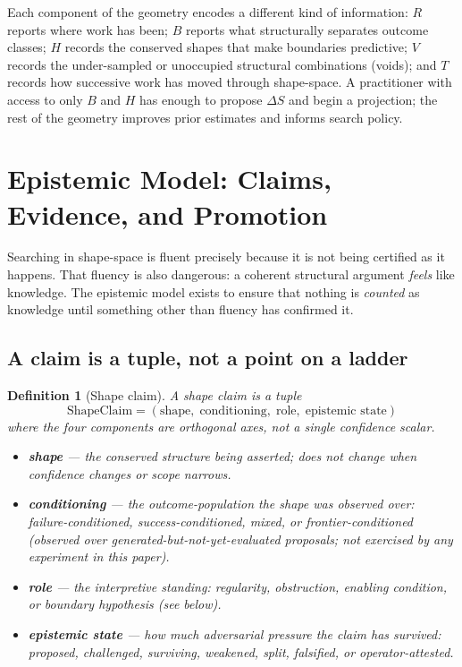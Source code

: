 \documentclass[11pt]{article}
\theoremstyle{gowthm}
\newtheorem{definition}{Definition}[section]
\theoremstyle{gowplain}
\begin{document}
Each component of the geometry encodes a different kind of information:
$R$ reports where work has been; $B$ reports what structurally separates
outcome classes; $H$ records the conserved shapes that make boundaries
predictive; $V$ records the under-sampled or unoccupied structural combinations
(voids); and $T$ records how successive work has moved through shape-space.
A practitioner with access to only $B$ and $H$ has enough to propose $\Delta S$
and begin a projection; the rest of the geometry improves prior estimates and
informs search policy.

\section{Epistemic Model: Claims, Evidence, and Promotion}
\label{sec:epistemic}

Searching in shape-space is fluent precisely because it is not being certified
as it happens. That fluency is also dangerous: a coherent structural argument
\emph{feels} like knowledge. The epistemic model exists to ensure that nothing
is \emph{counted} as knowledge until something other than fluency has confirmed it.

\subsection{A claim is a tuple, not a point on a ladder}

\begin{definition}[Shape claim]
A \emph{shape claim} is a tuple
\[
\text{ShapeClaim} = (\text{shape},\; \text{conditioning},\; \text{role},\;
\text{epistemic state})
\]
where the four components are orthogonal axes, not a single confidence scalar.
\begin{itemize}[nosep]
  \item \textbf{shape} --- the conserved structure being asserted; does not
    change when confidence changes or scope narrows.
  \item \textbf{conditioning} --- the outcome-population the shape was observed
    over: \emph{failure-conditioned}, \emph{success-conditioned}, \emph{mixed},
    or \emph{frontier-conditioned} (observed over generated-but-not-yet-evaluated
    proposals; not exercised by any experiment in this paper).
  \item \textbf{role} --- the interpretive standing: regularity, obstruction,
    enabling condition, or boundary hypothesis (see below).
  \item \textbf{epistemic state} --- how much adversarial pressure the claim
    has survived: \emph{proposed}, \emph{challenged}, \emph{surviving},
    \emph{weakened}, \emph{split}, \emph{falsified}, or \emph{operator-attested}.
\end{itemize}
\end{definition}
\end{document}
